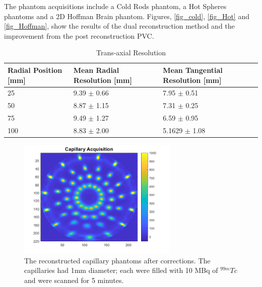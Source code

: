  The phantom acquisitions include a Cold Rods phantom, a Hot Spheres phantoms and a 2D Hoffman Brain phantom. Figures, \ref{fig_cold}, \ref{fig_Hot} and \ref{fig_Hoffman}, show the results of the dual reconstruction method and the improvement from the post reconstruction PVC. 



\begin{table}[!b]
\renewcommand{\arraystretch}{1.3}

\captionsetup{font=small}
\caption{Trans-axial Resolution}
\label{table_reso}
\centering

\begin{tabular}{|p{2.5cm}|p{2.8cm}|p{2.8cm}|}
\hline
Radial Position [mm]& Mean Radial Resolution [mm]& Mean Tangential Resolution [mm] \\
\hline
 25 & 9.39 $\pm$ 0.66 & 7.95 $\pm$ 0.51\\
\hline
 50 & 8.87 $\pm$ 1.15 & 7.31 $\pm$ 0.25\\
\hline
 75 & 9.49 $\pm$ 1.27 & 6.59 $\pm$ 0.95\\
\hline
 100 & 8.83 $\pm$ 2.00 & 5.1629 $\pm$ 1.08\\
\hline
\end{tabular}
\end{table}



\begin{figure}[!t]
\centering
\includegraphics[width=3in]{figures/Capillary_newLRF.PNG}

\caption{The reconstructed capillary phantoms after corrections. The capillaries had 1mm diameter; each were filled with 10 MBq of $^{99m}Tc$ and were scanned for 5 minutes.}
\label{fig_ImageRes}
\end{figure}

